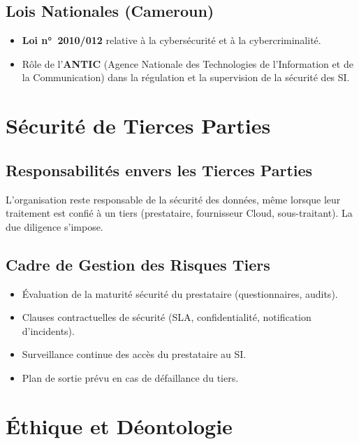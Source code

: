 \subsection{Lois Nationales (Cameroun)}
\begin{itemize}
    \item \textbf{Loi n°~2010/012} relative à la cybersécurité et à la cybercriminalité.
    \item Rôle de l'\textbf{ANTIC} (Agence Nationale des Technologies de l'Information et de la Communication) dans la régulation et la supervision de la sécurité des SI.
\end{itemize}

\section{Sécurité de Tierces Parties}

\subsection{Responsabilités envers les Tierces Parties}
L'organisation reste responsable de la sécurité des données, même lorsque leur traitement est confié à un tiers (prestataire, fournisseur Cloud, sous-traitant). La due diligence s'impose.

\subsection{Cadre de Gestion des Risques Tiers}
\begin{itemize}
    \item Évaluation de la maturité sécurité du prestataire (questionnaires, audits).
    \item Clauses contractuelles de sécurité (SLA, confidentialité, notification d'incidents).
    \item Surveillance continue des accès du prestataire au SI.
    \item Plan de sortie prévu en cas de défaillance du tiers.
\end{itemize}

\section{Éthique et Déontologie}

